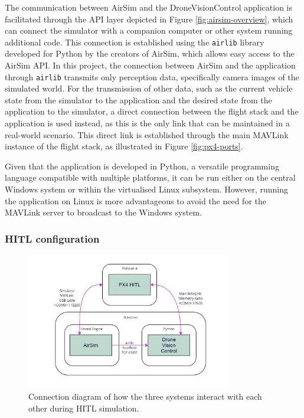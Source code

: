 The communication between AirSim and the DroneVisionControl application is facilitated through the API layer depicted in Figure \ref{fig:airsim-overview}, which can connect the simulator with a companion computer or other system running additional code. This connection is established using the \texttt{airlib} library developed for Python by the creators of AirSim, which allows easy access to the AirSim API. In this project, the connection between AirSim and the application through \texttt{airlib} transmits only perception data, specifically camera images of the simulated world. 
For the transmission of other data, such as the current vehicle state from the simulator to the application and the desired state from the application to the simulator, a direct connection between the flight stack and the application is used instead, as this is the only link that can be maintained in a real-world scenario. This direct link is established through the main MAVLink instance of the flight stack, as illustrated in Figure \ref{fig:px4-ports}.

Given that the application is developed in Python, a versatile programming language compatible with multiple platforms, it can be run either on the central Windows system or within the virtualised Linux subsystem. However, running the application on Linux is more advantageous to avoid the need for the MAVLink server to broadcast to the Windows system.



\subsubsection{HITL configuration}

\begin{figure}
  \centering
  \includegraphics[width=0.8\textwidth,keepaspectratio]{img/hitl-connections.jpg}
  \caption{Connection diagram of how the three systems interact with each other during HITL simulation.}\label{fig:hitl-connections}
\end{figure}

